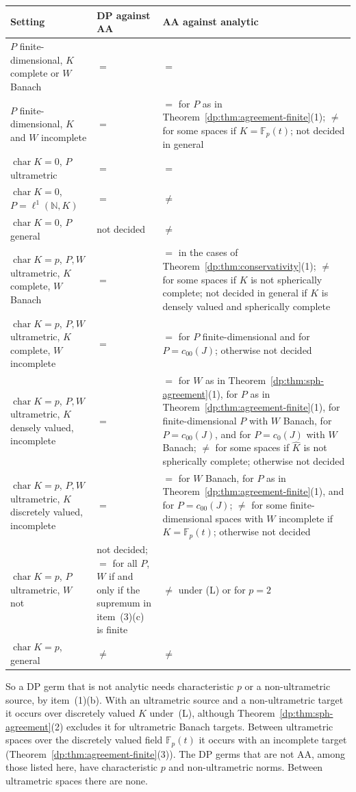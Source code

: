 \documentclass[11pt]{amsart}
\theoremstyle{definition}
\theoremstyle{remark}
\numberwithin{equation}{section}
\newcommand{\N}{\mathbb N}
\newcommand{\F}{\mathbb F}
\newcommand{\Kh}{\widehat K}
\theoremstyle{plain}
\theoremstyle{definition}
\theoremstyle{plain}
\begin{document}
\begin{center}
\small
\begin{tabular}{p{4.6cm}p{2.9cm}p{6.1cm}}
\hline
Setting & DP against AA & AA against analytic\\
\hline
$P$ finite-dimensional, $K$ complete or $W$ Banach & $=$ & $=$\\
$P$ finite-dimensional, $K$ and $W$ incomplete & $=$ & $=$ for $P$ as in Theorem~\ref{dp:thm:agreement-finite}(1); $\ne$ for some spaces if $K=\F_p(t)$; not decided in general\\
$\operatorname{char}K=0$, $P$ ultrametric & $=$ & $=$\\
$\operatorname{char}K=0$, $P=\ell^1(\N,K)$ & $=$ & $\ne$\\
$\operatorname{char}K=0$, $P$ general & not decided & $\ne$\\
$\operatorname{char}K=p$, $P,W$ ultrametric, $K$ complete, $W$ Banach & $=$ & $=$ in the cases of Theorem~\ref{dp:thm:conservativity}(1); $\ne$ for some spaces if $K$ is not spherically complete; not decided in general if $K$ is densely valued and spherically complete\\
$\operatorname{char}K=p$, $P,W$ ultrametric, $K$ complete, $W$ incomplete & $=$ & $=$ for $P$ finite-dimensional and for $P=c_{00}(J)$; otherwise not decided\\
$\operatorname{char}K=p$, $P,W$ ultrametric, $K$ densely valued, incomplete & $=$ & $=$ for $W$ as in Theorem~\ref{dp:thm:sph-agreement}(1), for $P$ as in Theorem~\ref{dp:thm:agreement-finite}(1), for finite-dimensional $P$ with $W$ Banach, for $P=c_{00}(J)$, and for $P=c_0(J)$ with $W$ Banach; $\ne$ for some spaces if $\Kh$ is not spherically complete; otherwise not decided\\
$\operatorname{char}K=p$, $P,W$ ultrametric, $K$ discretely valued, incomplete & $=$ & $=$ for $W$ Banach, for $P$ as in Theorem~\ref{dp:thm:agreement-finite}(1), and for $P=c_{00}(J)$; $\ne$ for some finite-dimensional spaces with $W$ incomplete if $K=\F_p(t)$; otherwise not decided\\
$\operatorname{char}K=p$, $P$ ultrametric, $W$ not & not decided; $=$ for all $P$, $W$ if and only if the supremum in item~(3)(c) is finite & $\ne$ under (L) or for $p=2$\\
$\operatorname{char}K=p$, general & $\ne$ & $\ne$\\
\hline
\end{tabular}
\end{center}

So a DP germ that is not analytic needs characteristic $p$ or a non-ultrametric source, by item~(1)(b). With an ultrametric source and a non-ultrametric target it occurs over discretely valued $K$ under~(L), although Theorem~\ref{dp:thm:sph-agreement}(2) excludes it for ultrametric Banach targets. Between ultrametric spaces over the discretely valued field $\F_p(t)$ it occurs with an incomplete target (Theorem~\ref{dp:thm:agreement-finite}(3)). The DP germs that are not AA, among those listed here, have characteristic $p$ and non-ultrametric norms. Between ultrametric spaces there are none.
\end{document}
